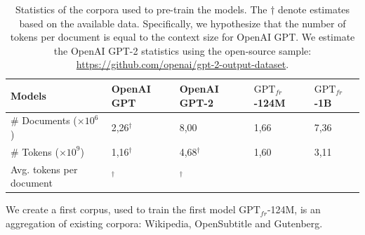 \begin{table}[!htbp]
\centering
    \begin{tabularx}{\textwidth}{l|YYYY}
    Models & OpenAI GPT &  OpenAI GPT-2 & $\text{GPT}_{fr}$-124M & $\text{GPT}_{fr}$-1B \\\hline
    \# Documents ($\times 10^6$) & 2,26$^\dagger$ & 8,00 & 1,66 & 7,36 \\
    \# Tokens ($\times 10^9$)& 1,16$^\dagger$ & 4,68$^\dagger$ & 1,60 & 3,11\\
    Avg. tokens per document & $^\dagger$ & $^\dagger$ &  & 
    \end{tabularx}
\caption{
 Statistics of the corpora used to pre-train the models. The $\dagger$ denote estimates based on the available data. Specifically, we hypothesize that the number of tokens per document is equal to the context size for OpenAI GPT. We estimate the OpenAI GPT-2 statistics using the open-source sample: \url{https://github.com/openai/gpt-2-output-dataset}.}
\end{table}

We create a first corpus, used to train the first model $\text{GPT}_{fr}$-124M, is an aggregation of existing corpora: Wikipedia, OpenSubtitle \parencite{tiedemann_12} and Gutenberg.  

